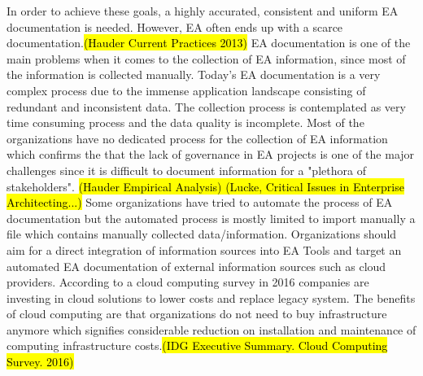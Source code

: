 In order to achieve these goals, a highly accurated, consistent and uniform EA documentation is needed. However, EA often ends up with a scarce documentation.\hl{(Hauder Current Practices 2013)} EA documentation is one of the main problems when it comes to the collection of EA information, since most of the information is collected manually. Today's EA documentation is a very complex process due to the immense application landscape consisting of redundant and inconsistent data. The collection process is contemplated as very time consuming  process and the data quality is incomplete. Most of the organizations have no dedicated process for the collection of EA information which confirms the that the lack of governance in EA projects is one of the major challenges since it is difficult to document information for a "plethora of stakeholders". \hl{(Hauder Empirical Analysis) (Lucke, Critical Issues in Enterprise Architecting...) } Some organizations have tried to automate the process of EA documentation but the automated process is mostly limited to import manually a file which contains manually collected data/information. 
Organizations should aim for a direct integration of information sources into EA Tools and target an automated EA documentation of external information sources such as cloud providers. 
According to a cloud computing survey in 2016 companies are investing in cloud solutions to lower costs and replace legacy system. The benefits of cloud computing are that organizations do not need to buy infrastructure anymore which signifies considerable reduction on installation and maintenance of computing infrastructure costs.\hl{(IDG Executive Summary. Cloud Computing Survey. 2016)}

